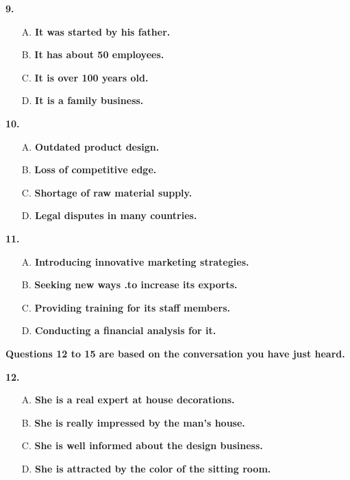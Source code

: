 \documentclass[UTF8,11pt]{ctexart}
\begin{document}
\textbf{9.}


\begin{itemize}[leftmargin=2em,itemsep=.2em,topsep=.4em]\item[A.] \textbf{It was started by his father.}
\item[B.] \textbf{It has about 50 employees.}
\item[C.] \textbf{It is over 100 years old.}
\item[D.] \textbf{It is a family business.}
\end{itemize}

\textbf{10.}


\begin{itemize}[leftmargin=2em,itemsep=.2em,topsep=.4em]\item[A.] \textbf{Outdated product design.}
\item[B.] \textbf{Loss of competitive edge.}
\item[C.] \textbf{Shortage of raw material supply.}
\item[D.] \textbf{Legal disputes in many countries.}
\end{itemize}

\textbf{11.}


\begin{itemize}[leftmargin=2em,itemsep=.2em,topsep=.4em]\item[A.] \textbf{Introducing innovative marketing strategies.}
\item[B.] \textbf{Seeking new ways .to increase its exports.}
\item[C.] \textbf{Providing training for its staff members.}
\item[D.] \textbf{Conducting a financial analysis for it.}
\end{itemize}

\textbf{Questions 12 to 15 are based on the conversation you have just heard.}


\textbf{12.}


\begin{itemize}[leftmargin=2em,itemsep=.2em,topsep=.4em]\item[A.] \textbf{She is a real expert at house decorations.}
\item[B.] \textbf{She is really impressed by the man's house.}
\item[C.] \textbf{She is well informed about the design business.}
\item[D.] \textbf{She is attracted by the color of the sitting room.}
\end{itemize}
\end{document}

